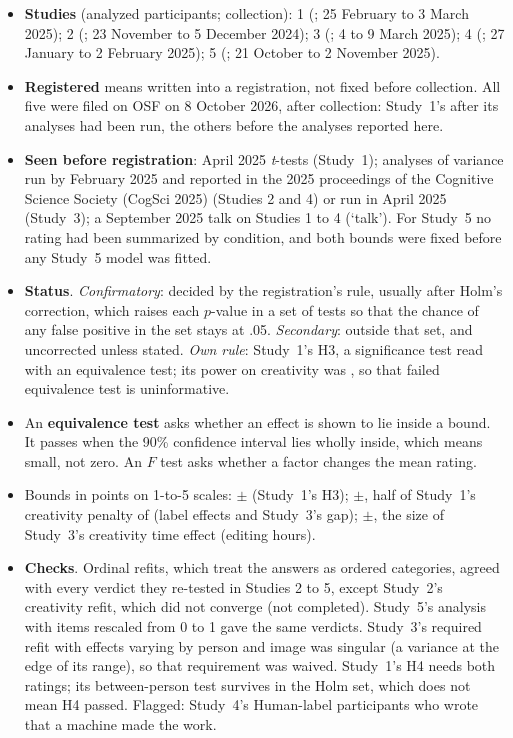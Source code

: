 \begin{itemize}
\setlength{\itemsep}{1pt}
\setlength{\parskip}{0pt}
\item \textbf{Studies} (analyzed participants; collection): 1 (\SOneN; 25 February to 3 March 2025); 2 (\STwoN; 23 November to 5 December 2024); 3 (\SThreeN; 4 to 9 March 2025); 4 (\SFourN; 27 January to 2 February 2025); 5 (\SFiveN; 21 October to 2 November 2025).
\item \textbf{Registered} means written into a registration, not fixed before collection. All five were filed on OSF on 8 October 2026, after collection: Study~1's after its analyses had been run, the others before the analyses reported here.
\item \textbf{Seen before registration}: April 2025 \emph{t}-tests (Study~1); analyses of variance run by February 2025 and reported in the 2025 proceedings of the Cognitive Science Society (CogSci 2025)\cite{kamper2025originalsin} (Studies 2 and 4) or run in April 2025 (Study~3); a September 2025 talk on Studies 1 to 4 (`talk'). For Study~5 no rating had been summarized by condition, and both bounds were fixed before any Study~5 model was fitted.
\item \textbf{Status}. \emph{Confirmatory}: decided by the registration's rule, usually after Holm's correction, which raises each $p$-value in a set of tests so that the chance of any false positive in the set stays at .05. \emph{Secondary}: outside that set, and uncorrected unless stated. \emph{Own rule}: Study~1's H3, a significance test read with an equivalence test; its power on creativity was \SOneHThreeCreatPower, so that failed equivalence test is uninformative.
\item An \textbf{equivalence test} asks whether an effect is shown to lie inside a bound. It passes when the 90\% confidence interval lies wholly inside, which means small, not zero. An $F$ test asks whether a factor changes the mean rating.
\item Bounds in points on 1-to-5 scales: $\pm$\SOneHThreeBound{} (Study~1's H3); $\pm$\SourceBound, half of Study~1's creativity penalty of \SOneHOneCreatDiffPrecise{} (label effects and Study~3's gap); $\pm$\SFiveEditTimeBound, the size of Study~3's creativity time effect (editing hours).
\item \textbf{Checks}. Ordinal refits, which treat the answers as ordered categories, agreed with every verdict they re-tested in Studies 2 to 5, except Study~2's creativity refit, which did not converge (not completed). Study~5's analysis with items rescaled from 0 to 1 gave the same verdicts. Study~3's required refit with effects varying by person and image was singular (a variance at the edge of its range), so that requirement was waived. Study~1's H4 needs both ratings; its between-person test survives in the Holm set, which does not mean H4 passed. Flagged: Study~4's \SFourMachineMadeN{} Human-label participants who wrote that a machine made the work.

\end{itemize}
